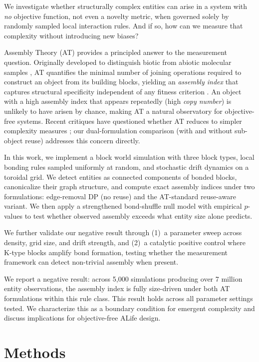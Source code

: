 \documentclass[letterpaper]{article}
\begin{document}
We investigate whether structurally complex entities can arise
in a system with \emph{no} objective function, not even a novelty
metric, when governed solely by randomly sampled local interaction
rules. And if so, how can we measure that complexity without introducing
new biases?

Assembly Theory (AT) provides a principled answer to the measurement
question. Originally developed to distinguish biotic from abiotic
molecular samples \citep{marshall2021assembly}, AT quantifies the
minimal number of joining operations required to construct an object from
its building blocks, yielding an \emph{assembly index} that captures
structural specificity independent of any fitness criterion
\citep{sharma2023assembly}. An object with a high assembly index that
appears repeatedly (high \emph{copy number}) is unlikely to have arisen
by chance, making AT a natural observatory for objective-free systems.
Recent critiques have questioned whether AT reduces to simpler
complexity measures \citep{uthamacumaran2024assembly}; our dual-formulation
comparison (with and without sub-object reuse) addresses this concern
directly.

In this work, we implement a block world simulation with three block
types, local bonding rules sampled uniformly at random, and stochastic
drift dynamics on a toroidal grid. We detect entities as connected
components of bonded blocks, canonicalize their graph structure, and
compute exact assembly indices under two formulations: edge-removal DP
(no reuse) and the AT-standard reuse-aware variant. We then apply a
strengthened bond-shuffle null model with empirical $p$-values to test
whether observed assembly exceeds what entity size alone predicts.

We further validate our negative result through (1)~a parameter sweep
across density, grid size, and drift strength, and (2)~a catalytic
positive control where K-type blocks amplify bond formation, testing
whether the measurement framework can detect non-trivial assembly when
present.

We report a negative result: across 5{,}000
simulations producing over 7 million entity observations, the assembly
index is fully size-driven under both AT formulations within this rule class.
This result holds across all parameter settings tested. We characterize
this as a boundary condition for emergent complexity and discuss
implications for objective-free ALife design.


\section{Methods}
\end{document}
